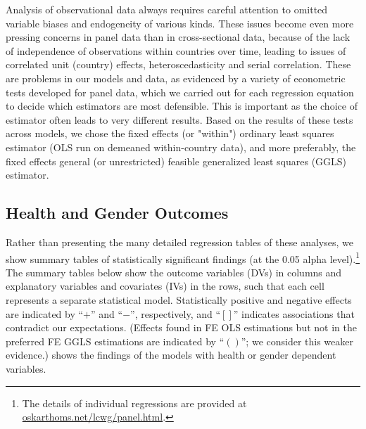 \documentclass[12pt]{article}
\begin{document}
Analysis of observational data always requires careful attention to omitted variable biases and endogeneity of various kinds.
These issues become even more pressing concerns in panel data than in cross-sectional data, because of the lack of independence of observations within countries over time, leading to issues of correlated unit (country) effects, heteroscedasticity and serial correlation.
These are problems in our models and data, as evidenced by a variety of econometric tests developed for panel data, which we carried out for each regression equation to decide which estimators are most defensible.
This is important as the choice of estimator often leads to very different results.
Based on the results of these tests across models, we chose the fixed effects (or "within") ordinary least squares estimator (OLS run on demeaned within-country data), and more preferably, the fixed effects general (or unrestricted) feasible generalized least squares (GGLS) estimator.

\subsection{Health and Gender Outcomes}

Rather than presenting the many detailed regression tables of these analyses, we show summary tables of statistically significant findings (at the 0.05 alpha level).\footnote{The details of individual regressions are provided at \href{oskarthoms.net/lcwg/}{oskarthoms.net/lcwg/panel.html}.}
The summary tables below show the outcome variables (DVs) in columns and explanatory variables and covariates (IVs) in the rows, such that each cell represents a separate statistical model. Statistically positive and negative effects are indicated by \enquote{$+$} and \enquote{$-$}, respectively, and \enquote{$[]$} indicates associations that contradict our expectations. (Effects found in FE OLS estimations but not in the preferred FE GGLS estimations are indicated by \enquote{$()$}; we consider this weaker evidence.)
 shows the findings of the models with health or gender dependent variables.
\end{document}
